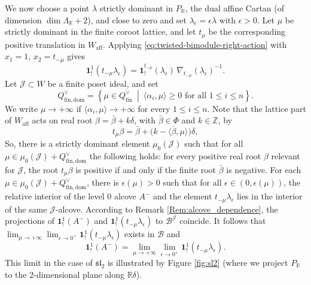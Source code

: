 \documentclass{amsart}
\newcommand{\bone}{\mathbf{1}}
\theoremstyle{definition}
\numberwithin{equation}{section}
\begin{document}
We now choose a point
$\lambda$ strictly dominant in $P_{\mathbb{R}}$, the dual affine Cartan (of dimension $\dim \Lambda_{\mathbb R}+2$), and close to zero and set
$\lambda_\epsilon=\epsilon\lambda$ with $\epsilon>0$. Let $\mu$ be strictly
dominant in the finite coroot lattice, and let $t_\mu$ be the corresponding
positive translation in \(W_{\mathrm{aff}}\). Applying
\eqref{eq:twisted-bimodule-right-action} with $x_1=1$, $x_2=t_{-\mu}$ gives
\begin{equation}\label{eq:limiting_bone}
\bone_!^1(t_{-\mu}\lambda_\epsilon)
=
\bone_!^{t_{-\mu}}(\lambda_\epsilon)\,\nabla_{t_{-\mu}}(\lambda_\epsilon)^{-1}.
\end{equation}
Let $\mathcal{J}\subset W$ be a finite poset ideal, and set
\[
Q_{\mathrm{fin,dom}}^\vee
=
\left\{
\mu\in Q_{\mathrm{fin}}^\vee
\ \middle|\
\langle\alpha_i,\mu\rangle\geqslant 0\text{ for all }1\leqslant i\leqslant n
\right\}.
\]
We write \(\mu\to+\infty\) if
\(\langle\alpha_i,\mu\rangle\to+\infty\) for every \(1\leqslant i\leqslant n\). Note that the lattice part of $W_{\mathrm{aff}}$ acts on real root
\(\beta=\bar\beta+k\delta\), with \(\bar\beta\in\Phi\) and
\(k\in\mathbb Z\),  by
\[
t_\mu\beta
=\bar\beta+\bigl(k-\langle\bar\beta,\mu\rangle\bigr)\delta,
\]
So, there is a strictly dominant element $\mu_0(\mathcal{J})$ such that for all
$\mu\in \mu_0(\mathcal{J})+Q_{\mathrm{fin,dom}}^\vee$ the following holds: for every positive real root $\beta$ relevant for $\mathcal{J}$, the root 
 \(t_\mu\beta\) is positive if and only if the finite root
\(\bar\beta\) is negative. For each
$\mu\in \mu_0(\mathcal{J})+Q_{\mathrm{fin,dom}}^\vee$, there is
$\epsilon(\mu)>0$ such that for all
$\epsilon\in (0,\epsilon(\mu))$, the relative interior of the level $0$
alcove $A^-$ and the element $t_{-\mu}\lambda_\epsilon$ lies in the
interior of the same $\mathcal{J}$-alcove.
According to Remark \ref{Rem:alcove_dependence},
the projections of $\bone_!^1(A^-)$ and
$\bone^1_!(t_{-\mu}\lambda_\epsilon)$ to $\mathcal{B}^{\mathcal{J}}$
coincide. It follows that
$\lim_{\mu\to+\infty}\lim_{\epsilon\to0^+}
\bone^1_!(t_{-\mu}\lambda_\epsilon)$ exists in $\mathcal{B}$ and
\begin{equation}\label{eq:bone_Aminus_formula}
\bone^1_!(A^-)
=
\lim_{\mu\to+\infty}\lim_{\epsilon\to0^+}
\bone^1_!(t_{-\mu}\lambda_\epsilon).
\end{equation}
This limit in the case of $\mathfrak{sl}_2$ is illustrated by Figure \ref{fig:sl2} (where we project $P_{\mathbb{R}}$ to the 2-dimensional plane along $\mathbb{R}\delta$).
\end{document}

